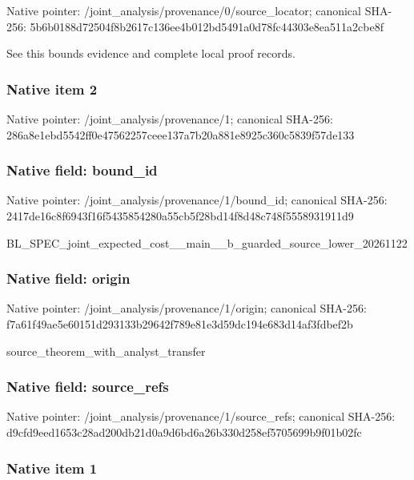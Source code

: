 \documentclass[10pt,a4paper]{article}
\begin{document}
Native pointer: /joint\_analysis/provenan\allowbreak{}ce/0/source\_locator; canonical SHA-256: 5b6b0188d72504f8b2617c13\allowbreak{}6ee4b012bd5491a0d78fc443\allowbreak{}03e8ea511a2cbe8f


See this bounds evidence and complete local proof records.


\subsubsection{Native item 2}


Native pointer: /joint\_analysis/provenance/1; canonical SHA-256: 286a8e1ebd5542ff0e475622\allowbreak{}57ceee137a7b20a881e8925c\allowbreak{}360c5839f57de133



\subsubsection{Native field: bound\_id}


Native pointer: /joint\_analysis/provenance/1/bound\_id; canonical SHA-256: 2417de16c8f6943f16f54358\allowbreak{}54280a55cb5f28bd14f8d48c\allowbreak{}748f5558931911d9


BL\_SPEC\_joint\_expected\_c\allowbreak{}ost\_\_main\_\_b\_guarded\_sou\allowbreak{}rce\_lower\_20261122


\subsubsection{Native field: origin}


Native pointer: /joint\_analysis/provenance/1/origin; canonical SHA-256: f7a61f49ae5e60151d293133\allowbreak{}b29642f789e81e3d59dc194e\allowbreak{}683d14af3fdbef2b


source\_theorem\_with\_analyst\_transfer


\subsubsection{Native field: source\_refs}


Native pointer: /joint\_analysis/provenan\allowbreak{}ce/1/source\_refs; canonical SHA-256: d9cfd9eed1653c28ad200db2\allowbreak{}1d0a9d6bd6a26b330d258ef5\allowbreak{}705699b9f01b02fc



\subsubsection{Native item 1}
\end{document}
